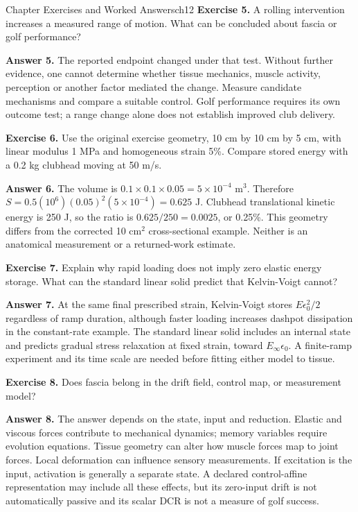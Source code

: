 \begin{exercises}{Chapter Exercises and Worked Answers}{ch12}
\textbf{Exercise 5.} A rolling intervention increases a measured range of motion. What can be concluded about fascia or golf performance?

\textbf{Answer 5.} The reported endpoint changed under that test. Without further evidence, one cannot determine whether tissue mechanics, muscle activity, perception or another factor mediated the change. Measure candidate mechanisms and compare a suitable control. Golf performance requires its own outcome test; a range change alone does not establish improved club delivery.

\textbf{Exercise 6.} Use the original exercise geometry, 10 cm by 10 cm by 5 cm, with linear modulus 1 MPa and homogeneous strain 5\%. Compare stored energy with a 0.2 kg clubhead moving at 50 m/s.

\textbf{Answer 6.} The volume is $0.1\times0.1\times0.05=5\times10^{-4}$ m$^3$. Therefore $S=0.5(10^6)(0.05)^2(5\times10^{-4})=0.625$ J. Clubhead translational kinetic energy is 250 J, so the ratio is $0.625/250=0.0025$, or 0.25\%. This geometry differs from the corrected 10 cm$^2$ cross-sectional example. Neither is an anatomical measurement or a returned-work estimate.

\textbf{Exercise 7.} Explain why rapid loading does not imply zero elastic energy storage. What can the standard linear solid predict that Kelvin-Voigt cannot?

\textbf{Answer 7.} At the same final prescribed strain, Kelvin-Voigt stores $E\epsilon_0^2/2$ regardless of ramp duration, although faster loading increases dashpot dissipation in the constant-rate example. The standard linear solid includes an internal state and predicts gradual stress relaxation at fixed strain, toward $E_\infty\epsilon_0$. A finite-ramp experiment and its time scale are needed before fitting either model to tissue.

\textbf{Exercise 8.} Does fascia belong in the drift field, control map, or measurement model?

\textbf{Answer 8.} The answer depends on the state, input and reduction. Elastic and viscous forces contribute to mechanical dynamics; memory variables require evolution equations. Tissue geometry can alter how muscle forces map to joint forces. Local deformation can influence sensory measurements. If excitation is the input, activation is generally a separate state. A declared control-affine representation may include all these effects, but its zero-input drift is not automatically passive and its scalar DCR is not a measure of golf success.

\end{exercises}
\clearpage
\flushbottom{}
